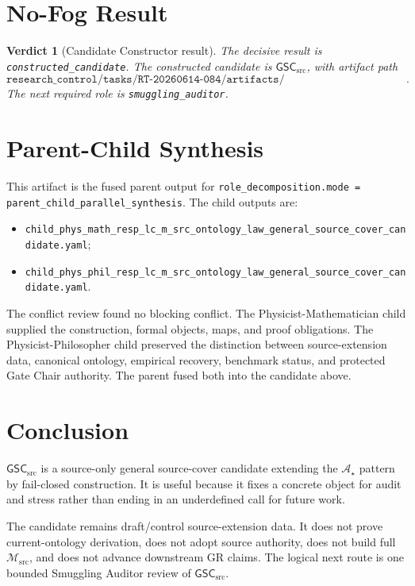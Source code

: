 \documentclass[11pt]{article}
\newcommand{\Msrc}{\mathcal{M}_{\mathrm{src}}}
\newcommand{\GSC}{\mathsf{GSC}_{\mathrm{src}}}
\newcommand{\Astar}{\mathcal A_{\star}}
\newtheorem{verdict}{Verdict}
\begin{document}
\section{No-Fog Result}

\begin{verdict}[Candidate Constructor result]
The decisive result is \texttt{constructed\_candidate}. The constructed
candidate is \(\GSC\), with artifact path
\[
\texttt{research\_control/tasks/RT-20260614-084/artifacts/125\_RESP\_LC\_M\_SRC\_ONTOLOGY\_LAW\_GENERAL\_SOURCE\_COVER\_CANDIDATE.tex}.
\]
The next required role is \texttt{smuggling\_auditor}.
\end{verdict}

\section{Parent-Child Synthesis}

This artifact is the fused parent output for
\texttt{role\_decomposition.mode = parent\_child\_parallel\_synthesis}. The
child outputs are:
\begin{itemize}
  \item \texttt{child\_phys\_math\_resp\_lc\_m\_src\_ontology\_law\_general\_source\_cover\_candidate.yaml};
  \item \texttt{child\_phys\_phil\_resp\_lc\_m\_src\_ontology\_law\_general\_source\_cover\_candidate.yaml}.
\end{itemize}
The conflict review found no blocking conflict. The
Physicist-Mathematician child supplied the construction, formal objects, maps,
and proof obligations. The Physicist-Philosopher child preserved the
distinction between source-extension data, canonical ontology, empirical
recovery, benchmark status, and protected Gate Chair authority. The parent
fused both into the candidate above.

\section{Conclusion}

\(\GSC\) is a source-only general source-cover candidate extending the
\(\Astar\) pattern by fail-closed construction. It is useful because it fixes a
concrete object for audit and stress rather than ending in an underdefined
call for future work.

The candidate remains draft/control source-extension data. It does not prove
current-ontology derivation, does not adopt source authority, does not build
full \(\Msrc\), and does not advance downstream GR claims. The logical next
route is one bounded Smuggling Auditor review of \(\GSC\).
\end{document}
